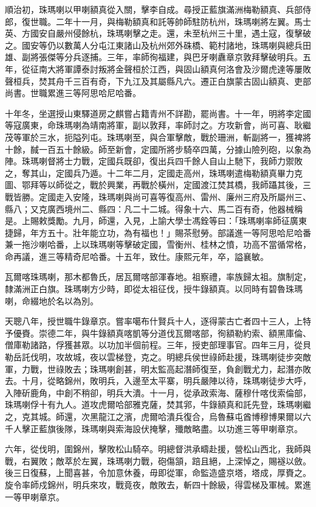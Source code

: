 \begin{pinyinscope}
順治初，珠瑪喇以甲喇額真從入關，擊李自成。尋授正藍旗滿洲梅勒額真、兵部侍郎，復世職。二年十一月，與梅勒額真和託等帥師駐防杭州，珠瑪喇將左翼。馬士英、方國安自嚴州侵餘杭，珠瑪喇擊之走。還，未至杭州三十里，遇土寇，復擊破之。國安等仍以數萬人分屯江東諸山及杭州郊外硃橋、範村諸地，珠瑪喇與總兵田雄、副將張傑等分兵逐捕。三年，率師徇福建，與巴牙喇纛章京敦拜擊破明兵。五年，從征南大將軍譚泰討叛將金聲桓於江西，與固山額真何洛會及沙爾虎達等屢敗聲桓兵，焚其舟千三百有奇，下九江及其屬縣凡六。遷正白旗蒙古固山額真、吏部尚書。世職累進三等阿思哈尼哈番。

十年冬，坐選授山東驛道房之麒嘗占籍青州不詳勘，罷尚書。十一年，明將李定國等寇廣東，命珠瑪喇為靖南將軍，副以敦拜，率師討之。方攻新會，尚可喜、耿繼茂等軍於三水，扼隘列屯。珠瑪喇至，與合軍擊敵，戰於珊洲，斬副將一，獲裨將十餘，馘一百五十餘級。師至新會，定國所將步騎卒四萬，分據山險列砲，以象為陣。珠瑪喇督將士力戰，定國兵既卻，復出兵四千餘人自山上馳下，我師力禦敗之，奪其山，定國兵乃遁。十二年二月，定國走高州，珠瑪喇遣梅勒額真畢力克圖、鄂拜等以師從之，戰於興業，再戰於橫州，定國渡江焚其橋，我師躡其後，三戰皆勝。定國走入安隆，珠瑪喇與尚可喜等復高州、雷州、廉州三府及所屬州三、縣八；又克廣西境州二、縣四：凡二十二城。得象十六、馬二百有奇，他器械稱是。上賜敕獎勵。九月，師還，入見，上諭大學士馮銓等曰：「珠瑪喇率師征廣東捷歸，年方五十。壯年能立功，為有福也！」賜茶慰勞。部議進一等阿思哈尼哈番兼一拖沙喇哈番，上以珠瑪喇等擊破定國，雪衡州、桂林之憤，功高不當循常格，命再議，進三等精奇尼哈番。十五年，致仕。康熙元年，卒，謚襄敏。

瓦爾喀珠瑪喇，那木都魯氏，居瓦爾喀部渾春地。祖察禮，率族歸太祖。旗制定，隸滿洲正白旗。珠瑪喇方少時，即從太祖征伐，授牛錄額真。以同時有碧魯珠瑪喇，命綴地於名以為別。

天聰八年，授世職牛錄章京。嘗率噶布什賢兵十人，逐得蒙古亡者四十三人，上特予優賚。崇德二年，與牛錄額真喀凱等分道伐瓦爾喀部，徇額勒約索、額黑庫倫、僧庫勒諸路，俘獲甚眾。以功加半個前程。三年，授吏部理事官。四年三月，從貝勒岳託伐明，攻故城，夜以雲梯登，克之。明總兵侯世祿師赴援，珠瑪喇徒步突敵軍，力戰，世祿敗去；珠瑪喇創甚，明太監高起潛師復至，負創戰尤力，起潛亦敗去。十月，從略錦州，敗明兵，入邊至太平寨，明兵嚴陣以待，珠瑪喇徒步大呼，入陣斫鹿角，中創不稍卻，明兵大潰。十一月，從承政索海、薩穆什喀伐索倫部，珠瑪喇俘十有九人。道攻虎爾哈部雅克薩，焚其郛，牛錄額真和託先登，珠瑪喇繼之，克其城。師還，次黑龍江之濱，虎爾哈潰兵復合，烏魯蘇屯酋博穆博果爾以六千人擊正藍旗後隊，珠瑪喇與索海設伏掩擊，殲敵略盡。以功進三等甲喇章京。

六年，從伐明，圍錦州，擊敗松山騎卒。明總督洪承疇赴援，營松山西北，我師與戰，右翼敗；敵萃於左翼，珠瑪喇力戰，砲傷頷，踣且絕，上深悼之，賜襚以斂。後三日復蘇，上聞喜甚，令加意休養，毋即從軍，命監造盛京塔，塔成，厚賚之。旋令率師戍錦州，明兵來攻，戰竟夜，敵敗去，斬四十餘級，得雲梯及軍械。累進一等甲喇章京。


\end{pinyinscope}
